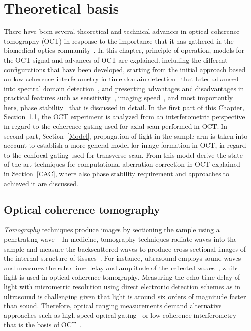 \newpage
{}
\chapter{Theoretical basis}\label{chap:theory}

There have been several theoretical and technical advances in optical coherence tomography (OCT) in response to the importance that it has gathered in the biomedical optics community~\cite{Fujimoto2015_Introduction}. In this chapter, principle of operation, models for the OCT signal and advances of OCT are explained, including the different configurations that have been developed, starting from the initial approach based on low coherence interferometry in time domain detection~\cite{Huang1991_Optical} that later advanced into spectral domain detection~\cite{Fercher1995_Measurement, Chinn1997_Optical}, and presenting advantages and disadvantages in practical features such as sensitivity~\cite{deBoer2003_Improved}, imaging speed~\cite{Yun2003_Highspeed}, and most importantly here, phase stability~\cite{White2003_vivo} that is discussed in detail. In the first part of this Chapter, Section~\ref{OCT}, the OCT experiment is analyzed from an interferometric perspective in regard to the coherence gating used for axial scan performed in OCT. In second part, Section~\ref{Model}, propagation of light in the sample arm is taken into account to establish a more general model for image formation in OCT, in regard to the confocal gating used for transverse scan. From this model derive the state-of-the-art techniques for computational aberration correction in OCT explained in Section~\ref{CAC}, where also phase stability requirement and approaches to achieved it are discussed.

\section{Optical coherence tomography}\label{OCT}

\textit{Tomography} techniques produce images by sectioning the sample using a penetrating wave~\cite{Guy2005_Introduction}. In medicine, tomography techniques radiate waves into the sample and measure the backscattered waves to produce cross-sectional images of the internal structure of tissues~\cite{Guy2005_Introduction}. For instance, ultrasound employs sound waves and measures the echo time delay and amplitude of the reflected waves~\cite{Szabo2014_Diagnostic}, while light is used in optical coherence tomography. Measuring the echo time delay of light with micrometric resolution using direct electronic detection schemes as in ultrasound is challenging given that light is around six orders of magnitude faster than sound. Therefore, optical ranging measurements demand alternative approaches such as high-speed optical gating~\cite{Duguay1971_Ultrahigh} or low coherence interferometry that is the basis of OCT~\cite{Huang1991_Optical}.

